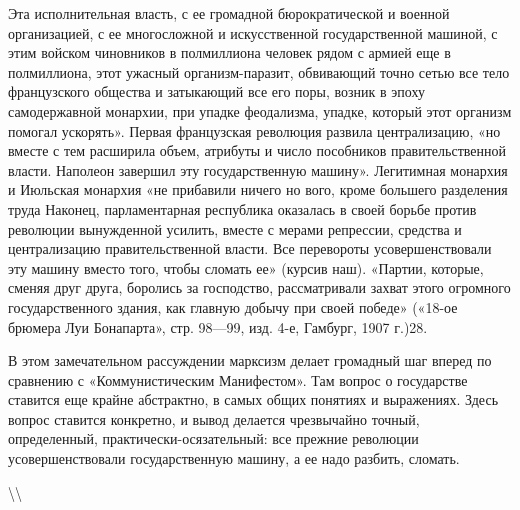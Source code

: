\documentclass[12pt]{article}
\newcommand\ellipsis{%
  \textbackslash\thinspace\textellipsis\textbackslash
}
\newcommand{\parnum}{(\arabic{parcount})}
\newcounter{parcount}
\newcommand\p{%
    \stepcounter{parcount}%
    \noindent\marginpar[]{\parnum}%
}
\begin{document}
\p Эта исполнительная власть, с ее громадной бюрократической и военной организацией, с ее многосложной и искусственной государственной машиной, с этим войском чиновников в полмиллиона человек рядом с армией еще в полмиллиона, этот ужасный организм-паразит, обвивающий точно сетью все тело французского общества и затыкающий все его поры, возник в эпоху самодержавной монархии, при упадке феодализма, упадке, который этот организм помогал ускорять». Первая французская революция развила централизацию, «но вместе с тем расширила объем, атрибуты и число пособников правительственной власти. Наполеон завершил эту государственную машину». Легитимная монархия и Июльская монархия «не прибавили ничего но вого, кроме большего разделения труда Наконец, парламентарная республика оказалась в своей борьбе против революции вынужденной усилить, вместе с мерами репрессии, средства и централизацию правительственной власти. Все перевороты усовершенствовали эту машину вместо того, чтобы сломать ее» (курсив наш). «Партии, которые, сменяя друг друга, боролись за господство, рассматривали захват этого огромного государственного здания, как главную добычу при своей победе» («18-ое брюмера Луи Бонапарта», стр. 98—99, изд. 4-е, Гамбург, 1907 г.)28.

\p В этом замечательном рассуждении марксизм делает громадный шаг вперед по сравнению с «Коммунистическим Манифестом». Там вопрос о государстве ставится еще крайне абстрактно, в самых общих понятиях и выражениях. Здесь вопрос ставится конкретно, и вывод делается чрезвычайно точный, определенный, практически-осязательный: все прежние революции усовершенствовали государственную машину, а ее надо разбить, сломать.

\ellipsis
\end{document}
